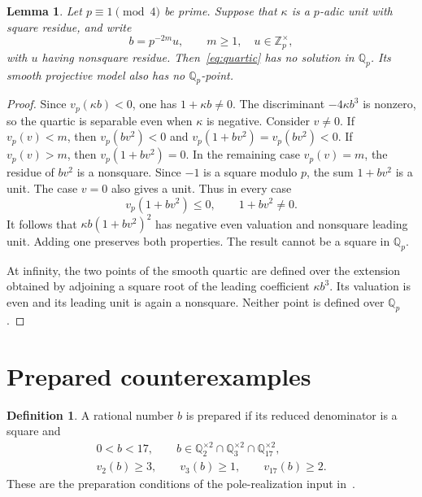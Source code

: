 \documentclass[11pt,a4paper]{article}
\newtheorem{lemma}[theorem]{Lemma}
\theoremstyle{definition}\newtheorem{definition}[theorem]{Definition}
\newcommand{\Q}{\mathbb Q}\newcommand{\Z}{\mathbb Z}
\begin{document}
\begin{lemma}\label{lem:negative}
Let $p\equiv1\pmod4$ be prime. Suppose that $\kappa$ is a
$p$-adic unit with square residue, and write
\[
                  b=p^{-2m}u,\qquad m\ge1,
                  \quad u\in\Z_p^\times,
\]
with $u$ having nonsquare residue. Then~\eqref{eq:quartic}
has no solution in $\Q_p$. Its smooth projective model also
has no $\Q_p$-point.
\end{lemma}
\begin{proof}
Since $v_p(\kappa b)<0$, one has $1+\kappa b\ne0$.
The discriminant $-4\kappa b^3$ is nonzero, so the quartic is
separable even when $\kappa$ is negative.
Consider $v\ne0$. If $v_p(v)<m$, then $v_p(bv^2)<0$ and
$v_p(1+bv^2)=v_p(bv^2)<0$. If $v_p(v)>m$, then
$v_p(1+bv^2)=0$. In the remaining case $v_p(v)=m$, the residue
of $bv^2$ is a nonsquare. Since $-1$ is a square modulo $p$,
the sum $1+bv^2$ is a unit. The case $v=0$ also gives a unit.
Thus in every case
\[
          v_p(1+bv^2)\le0,\qquad 1+bv^2\ne0.
\]
It follows that $\kappa b(1+bv^2)^2$ has negative even
valuation and nonsquare leading unit. Adding one preserves
both properties. The result cannot be a square in $\Q_p$.

At infinity, the two points of the smooth quartic are defined
over the extension obtained by adjoining a square root of the
leading coefficient $\kappa b^3$. Its valuation is even and
its leading unit is again a nonsquare. Neither point is defined
over $\Q_p$.
\end{proof}

\section{Prepared counterexamples}

\begin{definition}
A rational number $b$ is prepared if its reduced denominator is
a square and
\[
\begin{gathered}
 0<b<17,\qquad
 b\in\Q_2^{\times2}\cap\Q_3^{\times2}\cap\Q_{17}^{\times2},\\
 v_2(b)\ge3,\qquad v_3(b)\ge1,
                  \qquad v_{17}(b)\ge2.
\end{gathered}
\]
These are the preparation conditions of the pole-realization
input in~\cite[Section~3]{Dependencies}.
\end{definition}
\end{document}
